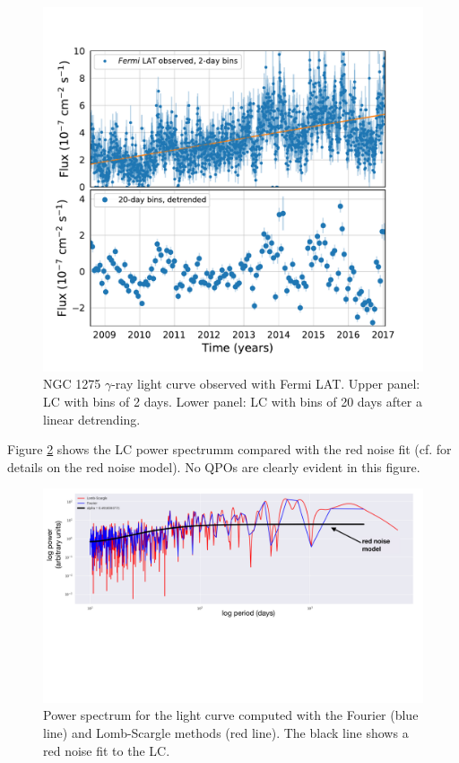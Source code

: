 \documentclass{iau}
\begin{document}
\begin{figure}[h]
\begin{center}
\includegraphics[width=0.7\linewidth]{figures/observations.pdf} 
\caption{NGC 1275 $\gamma$-ray light curve observed with Fermi LAT. Upper panel: LC with bins of 2 days. Lower panel: LC with bins of 20 days after a linear detrending.}
\label{lc}
\end{center}
\end{figure}

Figure \ref{fourier} shows the LC power spectrumm compared with the red noise fit (cf. \cite{Torrence1998} for details on the red noise model). 
No QPOs are clearly evident in this figure.

\begin{figure}[h]
\begin{center}
\includegraphics[width=0.8\linewidth, page=1, trim=0 300 150 0,clip=true]{figures/plots.pdf} 
\caption{Power spectrum for the light curve computed with the Fourier (blue line) and  Lomb-Scargle methods (red line). The black line shows a red noise fit to the LC.  }
\label{fourier}
\end{center}
\end{figure}
\end{document}
